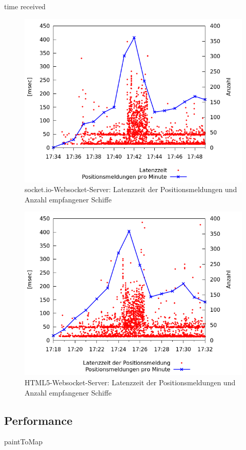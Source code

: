 time received
\begin {figure}[H]
\begin{center}
  \includegraphics[width=4.5in]{images/latency_timeReceived_socket_io.png}
\end{center}
\caption{socket.io-Websocket-Server: Latenzzeit der Positionsmeldungen und Anzahl empfangener Schiffe}
\end {figure}

\begin {figure}[H]
\begin{center}
  \includegraphics[width=4.5in]{images/latency_timeReceived_HTML5.png}
\end{center}
\caption{HTML5-Websocket-Server: Latenzzeit der Positionsmeldungen und Anzahl empfangener Schiffe}
\end {figure}


\subsection{Performance}
paintToMap

